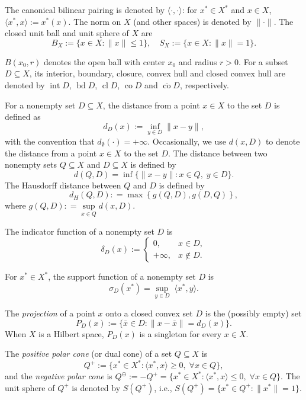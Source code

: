 \documentclass[11pt]{article}
\DeclareMathOperator{\intr}{int}
\DeclareMathOperator{\cl}{cl}
\DeclareMathOperator{\bd}{bd}
\DeclareMathOperator{\co}{co}
\begin{document}
The canonical bilinear pairing is denoted by $\langle \cdot, \cdot \rangle$: for $x^* \in X^*$ and $x \in X$, $\langle x^*, x \rangle := x^*(x)$. The norm on $X$ (and other spaces) is denoted by $\|\cdot\|$. The closed unit ball and unit sphere of $X$ are
\[
B_X := \{x \in X : \|x\| \leq 1\}, \quad S_X := \{x \in X : \|x\| = 1\}.
\]

$B(x_0,r)$ denotes the open ball with center $x_0$ and radius $r > 0$. For a subset $D \subseteq X$, its interior, boundary, closure, convex hull  and  closed convex hull    are denoted by $\intr D$, $\bd D$, $\cl D$, $\co D$ and $\overline{\co} D$,  respectively.

 


For a nonempty set \(D \subseteq X\), the distance from a point \(x \in X\) to the set \(D\) is defined as
\[
d_D(x) := \inf_{y \in D} \|x - y\|,
\]
with the convention that \(d_\emptyset(\cdot) = +\infty\). Occasionally, we use \(d(x,D)\) to denote the distance from a point \(x \in X\) to the set \(D\).
The distance between two nonempty sets \(Q \subseteq X\) and \(D \subseteq X\) is defined by
\[
d(Q,D) = \inf \{ \|x - y\| : x \in Q,\; y \in D \}.
\]
The Hausdorff distance between $Q$ and $D$ is defined by
$$d_H \left( {Q,D} \right): = \max \left\{ {g\left( {Q,D} \right),g\left( {D,Q} \right)} \right\},$$
where $g\left( {Q,D} \right): = \mathop {\sup }\limits_{x \in Q} d\left( {x,D} \right)$.  
 





The  indicator function  of a  nonempty set   $D$ is
\[
\delta_D(x) := \begin{cases}
	0, & x \in D, \\
	+\infty, & x \notin D.
\end{cases}
\]


For  $ x^* \in X^*$,     the support function   of a  nonempty set   $D$ is
$$\sigma_D(x^*)=\sup_{y\in D}  \;  \langle x^*,y\rangle.$$

The \emph{projection} of a point $x$ onto a closed convex set $D$ is the (possibly empty) set
\[
P_D(x) := \{\bar{x} \in D : \|x - \bar{x}\| = d_D(x)\}.
\]
When $X$ is a Hilbert space, $P_D(x)$ is a singleton for every $x \in X$.

 

The \emph{positive polar cone} (or dual cone) of a set $Q \subseteq X$ is
\[
Q^+ := \{x^* \in X^* : \langle x^*, x \rangle \geq 0, \; \forall x \in Q\},
\]
and the \emph{negative polar cone} is $Q^\ominus := -Q^+ = \{x^* \in X^* : \langle x^*, x \rangle \leq 0, \; \forall x \in Q\}$.    The unit sphere of \(Q^+\) is denoted by \(S(Q^+)\), i.e., \(S(Q^+) = \{ x^* \in Q^+ : \|x^*\| = 1 \}\).
\end{document}
